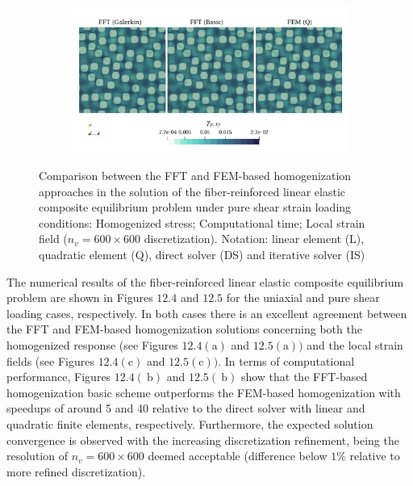 \begin{figure}[hbt]
\begin{subfigure}[b]{0.49\textwidth}
    \caption{}
    \label{subfig:linear_2D_shear_cpu_time_vs_n_voxels}
  \end{subfigure}
  \begin{subfigure}[b]{\textwidth}
    \centering
    \includegraphics[width=\textwidth]{figures/linear_2D_shear_strain_12}
    \caption{}
    \label{subfig:linear_2D_shear_strain_12}
  \end{subfigure}
\caption{Comparison between the FFT and FEM-based homogenization approaches in the
solution of the fiber-reinforced linear elastic composite equilibrium problem under pure shear
strain loading conditions:  Homogenized stress;  Computational time;  Local strain field
(\(n_v = 600 \times 600\) discretization). Notation: linear element (L), quadratic element (Q), direct solver
(DS) and iterative solver (IS)}
\label{fig:linear_3D_normal_comparison_crit}
\end{figure}

The numerical results of the fiber-reinforced linear elastic composite equilibrium problem are shown in Figures \(12.4\) and \(12.5\) for the uniaxial and pure shear loading cases, respectively.
In both cases there is an excellent agreement between the FFT and FEM-based homogenization solutions concerning both the homogenized response (see Figures \(12.4(\mathrm{a})\) and \(12.5(\mathrm{a}))\) and the local strain fields (see Figures \(12.4(\mathrm{c})\) and \(12.5(\mathrm{c}))\).
In terms of computational performance, Figures \(12.4(\mathrm{~b})\) and \(12.5(\mathrm{~b})\) show that the FFT-based homogenization basic scheme outperforms the FEM-based homogenization with speedups of around 5 and 40 relative to the direct solver with linear and quadratic finite elements, respectively.
Furthermore, the expected solution convergence is observed with the increasing discretization refinement, being the resolution of \(n_{v}=600 \times 600\) deemed acceptable (difference below \(1 \%\) relative to more refined discretization).

